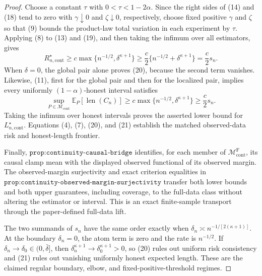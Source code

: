 \documentclass{article}
\begin{document}
\begin{proof}
Choose a constant \(\tau\) with \(0<\tau<1-2\alpha\).  Since the right sides of (14) and (18) tend to zero with \(\gamma\downarrow0\) and \(\zeta\downarrow0\), respectively, choose fixed positive \(\gamma\) and \(\zeta\) so that (9) bounds the product-law total variation in each experiment by \(\tau\).  Applying (8) to (13) and (19), and then taking the infimum over all estimators, gives
\[
 R_{n,\mathrm{cont}}^\star
 \geq c\max\{n^{-1/2},\delta^{\kappa+1}\}
 \geq\frac c2\{n^{-1/2}+\delta^{\kappa+1}\}
 =\frac c2s_n. \tag{20}
\]
When \(\delta=0\), the global pair alone proves (20), because the second term vanishes.  Likewise, (11), first for the global pair and then for the localized pair, implies every uniformly \((1-\alpha)\)-honest interval satisfies
\[
 \sup_{P\in\mathcal M_{\mathrm{cont}}}
 \mathbb E_P[\operatorname{len}(C_n)]
 \geq c\max\{n^{-1/2},\delta^{\kappa+1}\}
 \geq\frac c2s_n. \tag{21}
\]
Taking the infimum over honest intervals proves the asserted lower bound for \(L_{n,\mathrm{cont}}^\star\).  Equations (4), (7), (20), and (21) establish the matched observed-data risk and honest-length frontier.

Finally, \(\texttt{prop:continuity-causal-bridge}\) identifies, for each member of \(\mathcal M_{\mathrm{cont}}^{\mathrm F}\), its causal clamp mean with the displayed observed functional of its observed margin.  The observed-margin surjectivity and exact criterion equalities in \(\texttt{prop:continuity-observed-margin-surjectivity}\) transfer both lower bounds and both upper guarantees, including coverage, to the full-data class without altering the estimator or interval.  This is an exact finite-sample transport through the paper-defined full-data lift.

The two summands of \(s_n\) have the same order exactly when
\(\delta_n\asymp n^{-1/[2(\kappa+1)]}\).  At the boundary \(\delta_n=0\), the atom term is zero and the rate is \(n^{-1/2}\).  If \(\delta_n\to\delta_0\in(0,\bar\delta]\), then \(\delta_n^{\kappa+1}\to\delta_0^{\kappa+1}>0\), so (20) rules out uniform risk consistency and (21) rules out vanishing uniformly honest expected length.  These are the claimed regular boundary, elbow, and fixed-positive-threshold regimes.
\end{proof}
\end{document}
